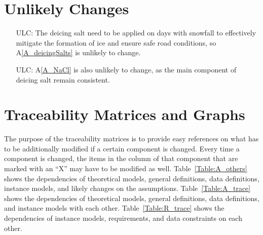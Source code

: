 \documentclass[12pt]{article}
\newcommand{\aref}[1]{A\ref{#1}}
\newcounter{lcnum} %
\newcounter{ulcnum} %
\begin{document}
\section{Unlikely Changes}    

\noindent \begin{itemize}
\item[ULC\refstepcounter{ulcnum}\theulcnum\label{ULC_saltSame}:] The deicing salt need to be applied on days with snowfall to effectively mitigate the formation of ice and ensure safe road conditions, so \aref{A_deicingSalts} is unlikely to change.

\item[ULC\refstepcounter{ulcnum}\theulcnum\label{ULC_NaCl}:] \aref{A_NaCl} is also unlikely to change, as the main component of deicing salt remain consistent.


\end{itemize}

\newpage

\section{Traceability Matrices and Graphs}

The purpose of the traceability matrices is to provide easy references on what
has to be additionally modified if a certain component is changed.  Every time a
component is changed, the items in the column of that component that are marked
with an ``X'' may have to be modified as well. Table~\ref{Table:A_others} shows the dependencies of theoretical models, general definitions, data definitions, instance models, and likely changes on the assumptions. Table~\ref{Table:A_trace} shows the dependencies of theoretical models, general definitions, data definitions, and instance models with each other. Table~\ref{Table:R_trace} shows the
dependencies of instance models, requirements, and data constraints on each
other. 
\end{document}
